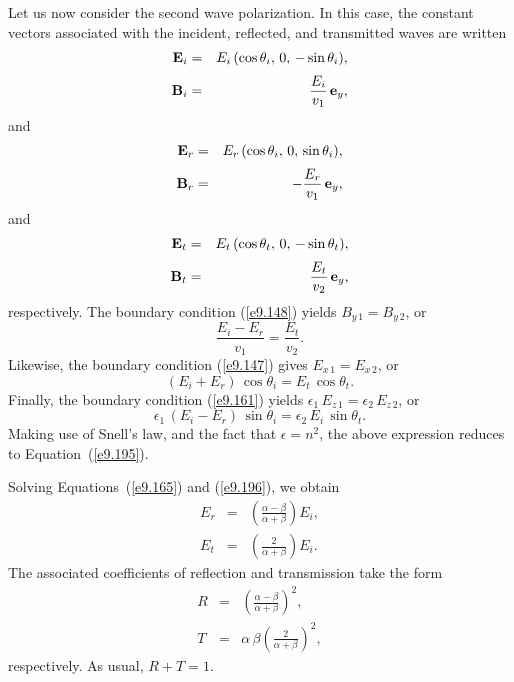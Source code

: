 Let us now consider the second wave polarization. In this case, the
constant vectors associated with the incident, reflected, and transmitted
waves are written
\begin{eqnarray}
{\bf E}_i &=& E_i\,(\cos\theta_i,\, 0,\,-\sin\theta_i),\\[0.5ex]
{\bf B}_i &=& \frac{E_i}{v_1}\,{\bf e}_y,
\end{eqnarray}
and
\begin{eqnarray}
{\bf E}_r&=& E_r\,(\cos\theta_i,\, 0,\,\sin\theta_i),\\[0.5ex]
{\bf B}_r&=&- \frac{E_r}{v_1}\,{\bf e}_y,
\end{eqnarray}
and
\begin{eqnarray}
{\bf E}_t &=& E_t\,(\cos\theta_t,\, 0,\,-\sin\theta_t),\\[0.5ex]
{\bf B}_t &=& \frac{E_t}{v_2}\,{\bf e}_y,
\end{eqnarray}
respectively.
The boundary condition (\ref{e9.148}) yields $B_{y\,1}= B_{y\,2}$, or
\begin{equation}\label{e9.195}
\frac{E_i-E_r}{v_1} = \frac{E_t}{v_2}.
\end{equation}
Likewise, the boundary condition (\ref{e9.147}) gives $E_{x\,1}=E_{x\,2}$, or
\begin{equation}\label{e9.196}
(E_i+E_r)\,\cos\theta_i = E_t\,\cos\theta_t.
\end{equation}
Finally, the boundary condition (\ref{e9.161}) yields $\epsilon_1\,E_{z\,1} = \epsilon_2\,E_{z\,2}$, or
\begin{equation}
\epsilon_1\,(E_i-E_r)\,\sin\theta_i = \epsilon_2\,E_i\,\sin\theta_t.
\end{equation}
Making use of Snell's law, and the fact that $\epsilon = n^2$, the
above expression reduces to Equation~(\ref{e9.195}).

Solving Equations~(\ref{e9.165}) and (\ref{e9.196}), we obtain
\begin{eqnarray}\label{e9.198}
E_r &=&\left(\frac{\alpha-\beta}{\alpha+\beta}\right) E_i,\\[0.5ex]
E_t &=& \left(\frac{2}{\alpha+\beta}\right) E_i.\label{e9.199}
\end{eqnarray}
The associated coefficients of reflection and transmission take the
form 
\begin{eqnarray}
R &=&\left(\frac{\alpha-\beta}{\alpha+\beta}\right)^2,\\[0.5ex]
T &=& \alpha\,\beta\left(\frac{2}{\alpha+\beta}\right)^2,
\end{eqnarray}
respectively. As usual, $R+T=1$. 

